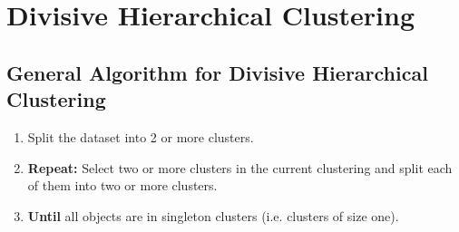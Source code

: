 \documentclass[11pt]{elegantbook}
\begin{document}
\section{Divisive Hierarchical Clustering}
\subsection{General Algorithm for Divisive Hierarchical Clustering}
\begin{enumerate}[1.]
    \item Split the dataset into 2 or more clusters.
    \item \textbf{Repeat:}
    Select two or more clusters in the current clustering and split each of them into two or more clusters.
    \item \textbf{Until} all objects are in singleton clusters (i.e. clusters of size one).
\end{enumerate}
\end{document}
